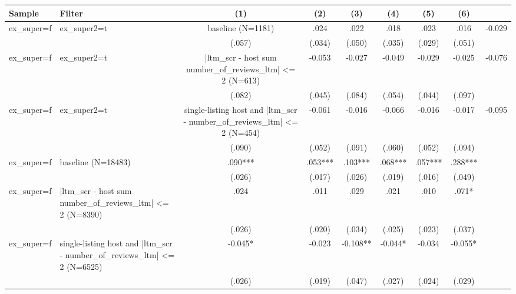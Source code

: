 \begin{tabular}{llcccccc}
\hline
Sample & Filter & (1) & (2) & (3) & (4) & (5) & (6) \\
\hline
ex_super=f & ex_super2=t & baseline (N=1181) & .024 & .022 & .018 & .023 & .016 & -0.029
\\
 &  & (.057) & (.034) & (.050) & (.035) & (.029) & (.051)
\\
ex_super=f & ex_super2=t & |ltm_scr - host sum number_of_reviews_ltm| <= 2 (N=613) & -0.053 & -0.027 & -0.049 & -0.029 & -0.025 & -0.076
\\
 &  & (.082) & (.045) & (.084) & (.054) & (.044) & (.097)
\\
ex_super=f & ex_super2=t & single-listing host and |ltm_scr - number_of_reviews_ltm| <= 2 (N=454) & -0.061 & -0.016 & -0.066 & -0.016 & -0.017 & -0.095
\\
 &  & (.090) & (.052) & (.091) & (.060) & (.052) & (.094)
\\
ex_super=f & baseline (N=18483) & .090*** & .053*** & .103*** & .068*** & .057*** & .288***
\\
 &  & (.026) & (.017) & (.026) & (.019) & (.016) & (.049)
\\
ex_super=f & |ltm_scr - host sum number_of_reviews_ltm| <= 2 (N=8390) & .024 & .011 & .029 & .021 & .010 & .071*
\\
 &  & (.026) & (.020) & (.034) & (.025) & (.023) & (.037)
\\
ex_super=f & single-listing host and |ltm_scr - number_of_reviews_ltm| <= 2 (N=6525) & -0.045* & -0.023 & -0.108** & -0.044* & -0.034 & -0.055*
\\
 &  & (.026) & (.019) & (.047) & (.027) & (.024) & (.029)
\\
\hline
\end{tabular}
